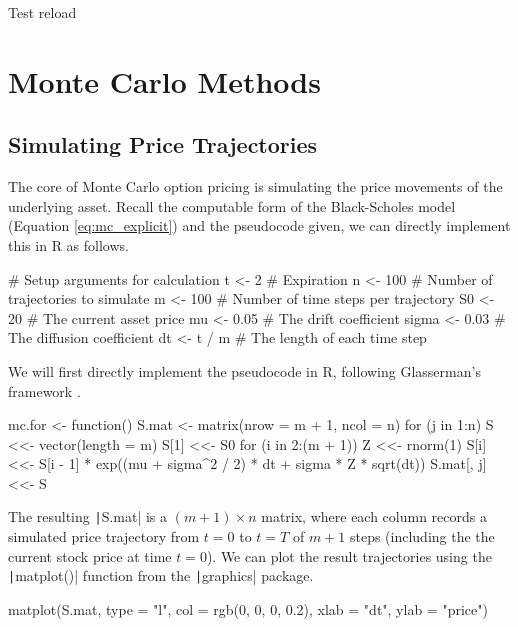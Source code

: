 Test reload


\section{Monte Carlo Methods}

\subsection{Simulating Price Trajectories}

The core of Monte Carlo option pricing is simulating the price movements of the underlying asset. Recall the computable form of the Black-Scholes model (Equation \ref{eq:mc_explicit}) and the pseudocode given, we can directly implement this in R as follows.

\begin{Rminted}
# Setup arguments for calculation
t <- 2 # Expiration
n <- 100 # Number of trajectories to simulate
m <- 100 # Number of time steps per trajectory
S0 <- 20 # The current asset price
mu <- 0.05 # The drift coefficient
sigma <- 0.03 # The diffusion coefficient
dt <- t / m # The length of each time step
\end{Rminted}

We will first directly implement the pseudocode in R, following Glasserman's framework \cite{Glasserman2003}.

\begin{Rminted}
mc.for <- function() {
    S.mat <- matrix(nrow = m + 1, ncol = n)
    for (j in 1:n) {
        S <<- vector(length = m)
        S[1] <<- S0
        for (i in 2:(m + 1)) {
            Z <<- rnorm(1)
            S[i] <<- S[i - 1] * exp((mu + sigma^2 / 2) * dt + sigma * Z * sqrt(dt))
        }
        S.mat[, j] <<- S
    }
}
\end{Rminted}

The resulting \texttt|S.mat| is a $(m + 1) \times n$ matrix, where each column records a simulated price trajectory from $t=0$ to $t=T$ of $m+1$ steps (including the the current stock price at time $t=0$). We can plot the result trajectories using the \texttt|matplot()| function from the \texttt|graphics| package.

\begin{Rminted}
matplot(S.mat, type = "l", col = rgb(0, 0, 0, 0.2),
        xlab = "dt", ylab = "price")
\end{Rminted}

